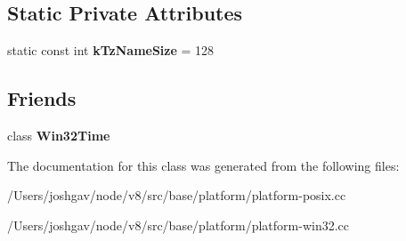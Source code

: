 \subsection*{Static Private Attributes}
\begin{DoxyCompactItemize}
\item 
static const int {\bfseries k\+Tz\+Name\+Size} = 128\hypertarget{classv8_1_1base_1_1_timezone_cache_ad4e73d10334f426dc6d748d6fd2adc77}{}\label{classv8_1_1base_1_1_timezone_cache_ad4e73d10334f426dc6d748d6fd2adc77}

\end{DoxyCompactItemize}
\subsection*{Friends}
\begin{DoxyCompactItemize}
\item 
class {\bfseries Win32\+Time}\hypertarget{classv8_1_1base_1_1_timezone_cache_af4edcf9562e8b46fd0c750ecd489bead}{}\label{classv8_1_1base_1_1_timezone_cache_af4edcf9562e8b46fd0c750ecd489bead}

\end{DoxyCompactItemize}


The documentation for this class was generated from the following files\+:\begin{DoxyCompactItemize}
\item 
/\+Users/joshgav/node/v8/src/base/platform/platform-\/posix.\+cc\item 
/\+Users/joshgav/node/v8/src/base/platform/platform-\/win32.\+cc\end{DoxyCompactItemize}
